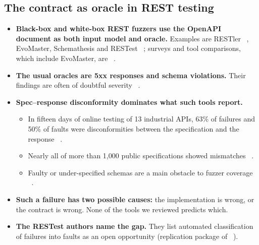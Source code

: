 \documentclass[acmsmall,screen,review,anonymous]{acmart}
\begin{document}
\subsection{The contract as oracle in REST testing}
\begin{itemize}
\item \textbf{Black-box and white-box REST fuzzers use the OpenAPI document as both input model and oracle.} Examples are RESTler ~\cite{P006}, EvoMaster, Schemathesis and RESTest ~\cite{P001}; surveys and tool comparisons, which include EvoMaster, are ~\cite{P002,P003,P004}.
\item \textbf{The usual oracles are 5xx responses and schema violations.} Their findings are often of doubtful severity ~\cite{P015}.
\item \textbf{Spec--response disconformity dominates what such tools report.}
\begin{itemize}
\item In fifteen days of online testing of 13 industrial APIs, 63\% of failures and 50\% of faults were disconformities between the specification and the response ~\cite{P001}.
\item Nearly all of more than 1,000 public specifications showed mismatches ~\cite{P004}.
\item Faulty or under-specified schemas are a main obstacle to fuzzer coverage ~\cite{P003}.
\end{itemize}
\item \textbf{Such a failure has two possible causes:} the implementation is wrong, or the contract is wrong. None of the tools we reviewed predicts which.
\item \textbf{The RESTest authors name the gap.} They list automated classification of failures into faults as an open opportunity (replication package of ~\cite{P001}).
\end{itemize}
\end{document}

